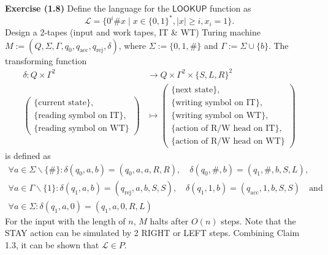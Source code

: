 \documentclass[a4paper]{article}
\begin{document}
\noindent\textbf{Exercise (1.8)}
    Define the language for the $\mathsf{LOOKUP}$ function as
    \[
        \mathcal L = \{0^i \# x \mid x\in \{0,1\}^*, |x| \geq i, x_i = 1\}.
    \]
    Design a 2-tapes (input and work tapes, IT \& WT) Turing machine $M := (Q,\Sigma,\Gamma,q_0,q_\text{acc},q_\text{rej},\delta)$, where $\Sigma := \{0,1,\#\}$ and $\Gamma := \Sigma \cup \{b\}$. The transforming function
    \begin{align*}
        \delta : Q\times \Gamma^2 &\to Q\times \Gamma^2 \times \{S,L,R\}^2\\
        \left(\begin{array}{l}
            \{\text{current state}\},\\
            \{\text{reading symbol on IT}\},\\
            \{\text{reading symbol on WT}\}
        \end{array}\right) &\mapsto \left(\begin{array}{l}
            \{\text{next state}\},\\
            \{\text{writing symbol on IT}\},\\
            \{\text{writing symbol on WT}\},\\
            \{\text{action of R/W head on IT}\},\\
            \{\text{action of R/W head on WT}\}
        \end{array}\right)
    \end{align*}
    is defined as
    \[
        \begin{array}{l}
            \forall a \in \Sigma\backslash \{\#\}: \delta(q_0,a,b) = (q_0,a,a,R,R), \quad
            \delta(q_0,\#,b) = (q_1,\#,b,S,L),\\
            
            \forall a \in \Gamma\backslash\{1\}: \delta(q_1,a,b) = (q_\text{rej},a,b,S,S), \quad
            \delta(q_1,1,b) = (q_\text{acc},1,b,S,S) \quad \text{and }\\

            \forall a \in \Sigma: \delta(q_1,a,0) = (q_1,a,0,R,L)
        \end{array}
    \]
    For the input with the length of $n$, $M$ halts after $O(n)$ steps. Note that the STAY action can be simulated by 2 RIGHT or LEFT steps. Combining Claim 1.3, it can be shown that $\mathcal L \in P$.
\end{document}
